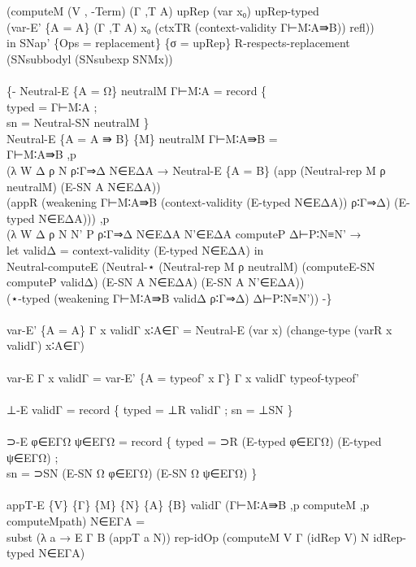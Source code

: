 {\begin{code}
{\>             (computeM (V , -Term) (Γ ,T A) upRep (var x₀) upRep-typed \<\\
\>             (var-E' \{A = A\} (Γ ,T A) x₀ (ctxTR (context-validity Γ⊢M∶A⇛B)) refl)) \<\\
\>  in SNap' \{Ops = replacement\} \{σ = upRep\} R-respects-replacement (SNsubbodyl (SNsubexp SNMx)) \<\\
\>\<\\
\>\{- Neutral-E \{A = Ω\} neutralM Γ⊢M∶A = record \{ \<\\
\>  typed = Γ⊢M∶A ; \<\\
\>  sn = Neutral-SN neutralM \}\<\\
\>Neutral-E \{A = A ⇛ B\} \{M\} neutralM Γ⊢M∶A⇛B = \<\\
\>  Γ⊢M∶A⇛B ,p \<\\
\>  (λ W Δ ρ N ρ∶Γ⇒Δ N∈EΔA → Neutral-E \{A = B\} (app (Neutral-rep M ρ neutralM) (E-SN A N∈EΔA)) \<\\
\>    (appR (weakening Γ⊢M∶A⇛B (context-validity (E-typed N∈EΔA)) ρ∶Γ⇒Δ) (E-typed N∈EΔA))) ,p \<\\
\>  (λ W Δ ρ N N' P ρ∶Γ⇒Δ N∈EΔA N'∈EΔA computeP Δ⊢P∶N≡N' → \<\\
\>    let validΔ = context-validity (E-typed N∈EΔA) in\<\\
\>    Neutral-computeE (Neutral-⋆ (Neutral-rep M ρ neutralM) (computeE-SN computeP validΔ) (E-SN A N∈EΔA) (E-SN A N'∈EΔA)) \<\\
\>    (⋆-typed (weakening Γ⊢M∶A⇛B validΔ ρ∶Γ⇒Δ) Δ⊢P∶N≡N')) -\}\<\\
\>\<\\
\>var-E' \{A = A\} Γ x validΓ x∶A∈Γ = Neutral-E (var x) (change-type (varR x validΓ) x∶A∈Γ)\<\\
\>\<\\
\>var-E Γ x validΓ = var-E' \{A = typeof' x Γ\} Γ x validΓ typeof-typeof'\<\\
\>\<\\
\>⊥-E validΓ = record \{ typed = ⊥R validΓ ; sn = ⊥SN \}\<\\
\>\<\\
\>⊃-E φ∈EΓΩ ψ∈EΓΩ = record \{ typed = ⊃R (E-typed φ∈EΓΩ) (E-typed ψ∈EΓΩ) ; \<\\
\>  sn = ⊃SN (E-SN Ω φ∈EΓΩ) (E-SN Ω ψ∈EΓΩ) \}\<\\
\>\<\\
\>appT-E \{V\} \{Γ\} \{M\} \{N\} \{A\} \{B\} validΓ (Γ⊢M∶A⇛B ,p computeM ,p computeMpath) N∈EΓA = \<\\
\>  subst (λ a → E Γ B (appT a N)) rep-idOp (computeM V Γ (idRep V) N idRep-typed N∈EΓA)\<\\
}
\end{code}}
